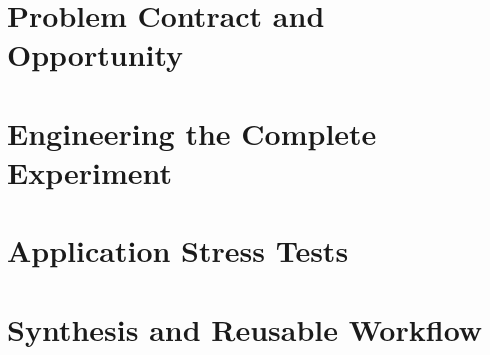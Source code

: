 \documentclass[11pt,letterpaper]{article}
\begin{document}
\hypersetup{pageanchor=false}

\hypersetup{pageanchor=true}


\tableofcontents
\clearpage
{}

\part{Problem Contract and Opportunity}





\part{Engineering the Complete Experiment}





\part{Application Stress Tests}



\part{Synthesis and Reusable Workflow}





\appendix





\end{document}
